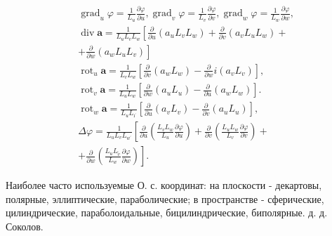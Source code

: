 \documentclass[10pt]{article}
\begin{document}
\[

\begin{aligned}

& \operatorname{grad}_{u} \varphi=\frac{1}{L_{u}} \frac{\partial \varphi}{\partial u}, \operatorname{grad}_{v} \varphi=\frac{1}{L_{v}} \frac{\partial \varphi}{\partial v}, \operatorname{grad}_{w} \varphi=\frac{1}{L_{w}} \frac{\partial \varphi}{\partial w}, \\

& \operatorname{div} \boldsymbol{a}=\frac{1}{L_{u} L_{v} L_{w}}\left[\frac{\partial}{\partial u}\left(a_{u} L_{v} L_{w}\right)+\frac{\partial}{\partial v}\left(a_{v} L_{u} L_{w}\right)+\right. \\

& \left.+\frac{\partial}{\partial w}\left(a_{w} L_{u} L_{v}\right)\right] \\

& \operatorname{rot}_{u} \boldsymbol{a}=\frac{1}{L_{v} L_{w}}\left[\frac{\partial}{\partial v}\left(a_{w} L_{w}\right)-\frac{\partial}{\partial w} i\left(a_{v} L_{v}\right)\right], \\

& \operatorname{rot}_{v} \boldsymbol{a}=\frac{1}{L_{u} L_{w}}\left[\frac{\partial}{\partial w}\left(a_{u} L_{u}\right)-\frac{\partial}{\partial u}\left(a_{w} L_{w}\right)\right] \text {. } \\

& \operatorname{rot}_{w} \boldsymbol{a}=\frac{1}{L_{u} L_{\imath^{\prime}}}\left[\frac{\partial}{\partial u}\left(a_{v} L_{v}\right)-\frac{\partial}{\partial v}\left(a_{u} L_{u}\right)\right], \\

& \Delta \varphi=\frac{1}{L_{u} L_{v} L_{w^{\prime}}}\left[\frac{\partial}{\partial u}\left(\frac{L_{v} L_{w}}{L_{u}} \frac{\partial \varphi}{\partial u}\right)+\frac{\partial}{\partial v}\left(\frac{L_{u} L_{w}}{L_{v}} \frac{\partial \varphi}{\partial v}\right)+\right. \\

& \left.+\frac{\partial}{\partial w}\left(\frac{L_{u} L_{\tilde{v}}}{L_{w}} \frac{\partial \varphi}{\partial w}\right)\right] \text {. }

\end{aligned}

\]



Наиболее часто используемые О. с. координат: на плоскости - декартовы, полярные, эллиптические, параболические; в пространстве - сферические, цилиндрические, параболоидальные, бицилиндрические, биполярные. д. д. Соколов.
\end{document}
